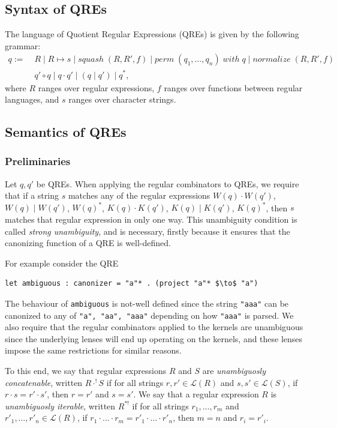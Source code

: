 \documentclass{svproc}
\newcommand{\cd}[1]{\lstinline[backgroundcolor=\color{white}]$#1$}
\newcommand{\squash}[3]{\ensuremath{\mathit{squash} \; (#1, #2, #3)}}
\newcommand{\perm}[2]{\ensuremath{\mathit{perm}\; (#1)\; \mathit{with}\; #2}}
\newcommand{\normalize}[3]{\ensuremath{\mathit{normalize} \; (#1, #2, #3)}}
\newcommand{\sep}{\ensuremath{\; | \;}}
\begin{document}
\subsection{Syntax of QREs}
The language of Quotient Regular Expressions (QREs) is given by the following
grammar:
\begin{align*}
q := \; &R \sep R \mapsto s \sep \squash{R}{R'}{f} \sep
\perm{q_1, \ldots, q_n}{q} \;  | \; \normalize{R}{R'}{f}\\
&q' \circ q \sep q \cdot q' \sep (q \sep q') \sep q^*,
\end{align*}
where $R$ ranges over regular expressions, $f$ ranges over functions between
regular languages, and $s$ ranges over character strings.
  
\subsection{Semantics of QREs}
\subsubsection{Preliminaries}
Let $q, q'$ be QREs. When applying the regular combinators to QREs, we require
that if a string $s$ matches any of the regular expressions $W(q) \cdot W(q')$,
$W(q) \sep W(q')$, $W(q)^*$, $K(q) \cdot K(q')$,
$K(q) \sep K(q')$, $K(q)^*$, then $s$ matches that regular expression in
only one way. This unambiguity condition is called {\em strong unambiguity},
and is necessary, firstly because it ensures that the canonizing function of a
QRE is well-defined.

For example consider the QRE

\begin{lstlisting}
let ambiguous : canonizer = "a"* . (project "a"* $\to$ "a")
\end{lstlisting}

\noindent The behaviour of \cd{ambiguous} is not-well defined since the string
\cd{"aaa"} can be canonized to any of \cd{"a", "aa", "aaa"} depending on how
\cd{"aaa"} is parsed. We also require that the regular combinators applied to
the kernels are unambiguous since the underlying lenses will end up operating
on the kernels, and these lenses impose the same restrictions for similar
reasons.

To this end, we say that regular expressions $R$ and $S$ are
\textit{unambiguosly concatenable}, written $R \cdot^! S$ if for all strings
$r, r' \in \mathcal{L}(R)$ and $s, s' \in \mathcal{L}(S)$, if $r \cdot s = r'
\cdot s'$, then $r = r'$ and $s = s'$. We say that a regular expression $R$ is
\textit{unambiguosly iterable}, written $R^{*!}$ if for all strings $r_1,
\ldots, r_m$ and $r'_1, \ldots, r'_n \in \mathcal{L}(R)$, if $r_1 \cdot \ldots
\cdot r_m = r'_1 \cdot \ldots \cdot r'_n$, then $m = n$ and $r_i = r'_i$.
\end{document}
